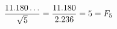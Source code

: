 \documentclass[preview]{standalone}
\begin{document}
\begin{align*}
\special{dvisvgm:raw <g id='unique000'>}\frac{11.180\ldots}{\sqrt{5}} = \frac{11.180}{2.236} = 5 = F_5\special{dvisvgm:raw </g>}
\end{align*}
\end{document}
